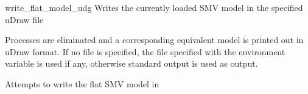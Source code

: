 \begin{nusmvCommand} {write\_flat\_model\_udg} {Writes the currently loaded SMV model in the specified uDraw file}


Processes are eliminated and a corresponding equivalent model is
printed out in uDraw format.  If no file is specified, the file
specified with the environment variable
 is used if any, otherwise
standard output is used as output.

\begin{cmdOpt}
 {Attempts to write the flat
SMV model in }
\end{cmdOpt}



\end{nusmvCommand}
